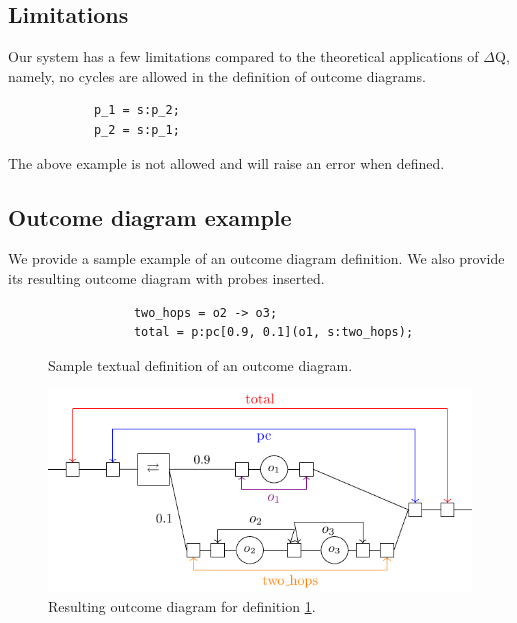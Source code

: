             
        \subsection{Limitations}
            Our system has a few limitations compared to the theoretical applications of $\Delta$Q, namely, no cycles are allowed in the definition of outcome diagrams. 
        
        \begin{verbatim}
            p_1 = s:p_2;
            p_2 = s:p_1;
        \end{verbatim}
        The above example is not allowed and will raise an error when defined.  

    \subsection{Outcome diagram example}
        We provide a sample example of an outcome diagram definition. We also provide its resulting outcome diagram with probes inserted.
        \begin{figure}[H]
        \begin{verbatim}
            two_hops = o2 -> o3;
            total = p:pc[0.9, 0.1](o1, s:two_hops);
        \end{verbatim}
            \caption{Sample textual definition of an outcome diagram.}
        \label{code:outcd}
        \end{figure}

        \begin{figure}[H]
            \begin{center}
                \includegraphics[scale=1.3]{tikz/system.pdf}
            \end{center}
            \caption{Resulting outcome diagram for definition \ref{code:outcd}.}%
        \end{figure}
